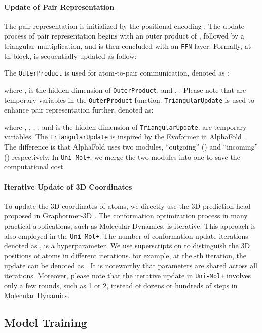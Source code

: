\documentclass{article}
\newcommand{\name}{\texttt{Uni-Mol+}\xspace}
\newcommand{\opm}{\texttt{OuterProduct}\xspace}
\newcommand{\tm}{\texttt{TriangularUpdate}\xspace}
\newcommand{\ffn}{\texttt{FFN}\xspace}
\begin{document}
\vspace{-6pt}
\paragraph{Update of Pair Representation}
The pair representation  is initialized by the positional encoding . The update process of pair representation begins with an outer product of , followed by a  triangular multiplication, and is then concluded with an \ffn layer. 
Formally, at -th block,  is sequentially updated as follow:

The \opm is used for atom-to-pair communication, denoted as :

where ,  is the hidden dimension of \opm, and , . Please note that  are temporary variables in the \opm function. \tm is used to enhance pair representation further, denoted as:

where , , , , and  is the hidden dimension of \tm.  are temporary variables. The \tm is inspired by the Evoformer in AlphaFold \cite{jumper_highly_2021}. The difference is that AlphaFold uses two modules, ``outgoing'' () and ``incoming''  () respectively. In \name, we merge the two modules into one to save the computational cost. 

\vspace{-6pt}
\paragraph{Iterative Update of 3D Coordinates}

To update the 3D coordinates of atoms, we directly use the 3D prediction head proposed in Graphormer-3D \cite{shi2022benchmarking}.  The conformation optimization process in many practical applications, such as Molecular Dynamics, is iterative. This approach is also employed in the \name. The number of conformation update iterations denoted as , is a hyperparameter. 
We use superscripts on  to distinguish the 3D positions of atoms in different iterations. for example, at the -th iteration, the update can be denoted as . 
It is noteworthy that parameters  are shared across all iterations. Moreover, please note that the iterative update in \name involves only a few rounds, such as 1 or 2, instead of dozens or hundreds of steps in Molecular Dynamics.



\subsection{Model Training} \label{sec:training}
\end{document}
